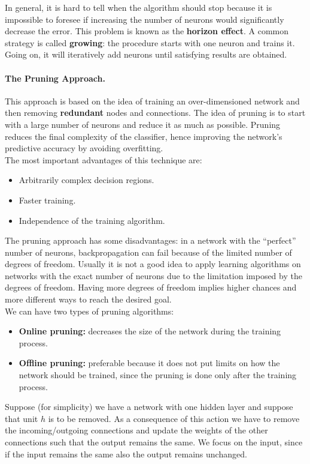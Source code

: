 In general, it is hard to tell when the algorithm should stop because it is impossible to foresee if increasing the number of neurons would significantly decrease the error. This problem is known as the \textbf{horizon effect}. A common strategy is called \textbf{growing}: the procedure starts with one neuron and trains it. Going on, it will iteratively add neurons until satisfying results are obtained.

\paragraph*{The Pruning Approach.} This approach is based on the idea of training an over-dimensioned network and then removing \textbf{redundant} nodes and connections. The idea of pruning is to start with a large number of neurons and reduce it as much as possible. Pruning reduces the final complexity of the classifier, hence improving the network's predictive accuracy by avoiding overfitting.\\
The most important advantages of this technique are:
\begin{itemize}
	\item Arbitrarily complex decision regions.
	\item Faster training.
	\item Independence of the training algorithm.
\end{itemize}

The pruning approach has some disadvantages: in a network with the ``perfect'' number of neurons, backpropagation can fail because of the limited number of degrees of freedom. Usually it is not a good idea to apply learning algorithms on networks with the exact number of neurons due to the limitation imposed by the degrees of freedom. Having more degrees of freedom implies higher chances and more different ways to reach the desired goal.\\
We can have two types of pruning algorithms:
\begin{itemize}
	\item \textbf{Online pruning:} decreases the size of the network during the training process.
	\item \textbf{Offline pruning:} preferable because it does not put limits on how the network should be trained, since the pruning is done only after the training process. 
\end{itemize}
Suppose (for simplicity) we have a network with one hidden layer and suppose that unit $h$ is to be removed. 
As a consequence of this action we have to remove the incoming/outgoing connections and update the weights of the other connections such that the output remains the same. We focus on the input, since if the input remains the same also the output remains unchanged.


